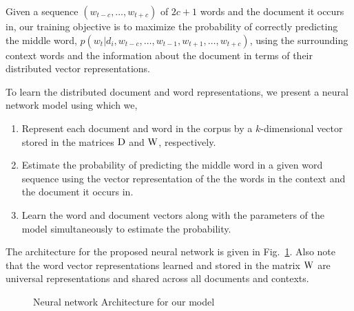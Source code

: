 Given a sequence $(w_{t-c}, \ldots, w_{t+c})$ of $2c+1$ words and the document it occurs in, our training objective is to maximize the probability of correctly predicting the middle word, $p(w_{t} | d_{i}, w_{t-c}, \ldots, w_{t-1}, w_{t+1}, \ldots, w_{t+c})$, using the surrounding context words and the information about the document in terms of their distributed vector representations. 

To learn the distributed document and word representations, we present a neural network model using which we,
\begin{enumerate}
\item Represent each document and word in the corpus by a $k$-dimensional vector stored in the matrices $\mathrm{D}$ and $\mathrm{W}$, respectively.
\item Estimate the probability of predicting the middle word in a given word sequence using the vector representation of the the words in the context and the document it occurs in.
\item Learn the word and document vectors along with the parameters of the model simultaneously to estimate the probability.
\end{enumerate}
The architecture for the proposed neural network is given in Fig.~\ref{fig:nn:archi}.
Also note that the word vector representations learned and stored in the matrix $\mathrm{W}$ are universal representations and shared across all documents and contexts.
\begin{figure}[h!]
    \centering
        
    \caption{Neural network Architecture for our model}
    \label{fig:nn:archi}
\end{figure}

